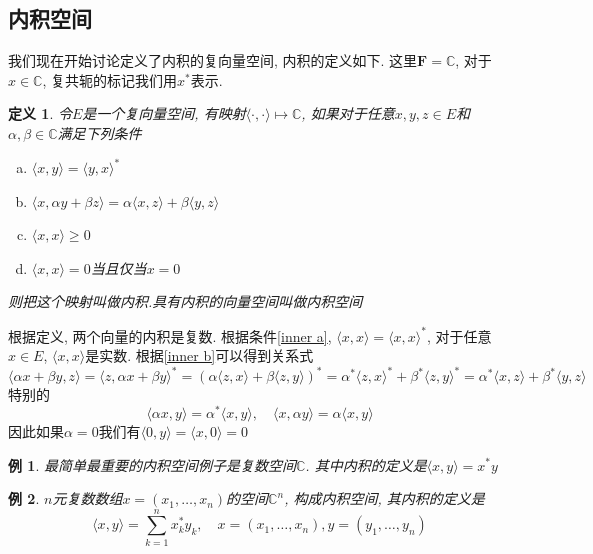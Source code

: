 \documentclass[a4paper,11pt]{book}
\newtheorem{definition}{\hspace{2em}定义}[section]
\newtheorem{example}{例}[section]
\begin{document}
\subsection*{内积空间}
我们现在开始讨论定义了内积的复向量空间, 内积的定义如下. 这里$\mathbf{F}=\mathbb{C}$, 对于$x\in\mathbb{C}$, 复共轭的标记我们用$x^*$表示.
\begin{definition}\label{inner def}
  令$E$是一个复向量空间, 有映射$\langle\cdot,\cdot\rangle\mapsto\mathbb{C}$, 如果对于任意$x,y,z\in E$和$\alpha,\beta\in \mathbb{C}$满足下列条件
  \begin{enumerate}[(a)]
    \item\label{inner a} $\langle x,y\rangle=\langle y,x\rangle^*$
    \item\label{inner b} $\langle x,\alpha y+\beta z\rangle=\alpha\langle x,z\rangle+\beta\langle y,z\rangle$
    \item $\langle x,x\rangle\geq 0$
    \item $\langle x,x\rangle=0$当且仅当$x=0$
  \end{enumerate}
  则把这个映射叫做内积.具有内积的向量空间叫做内积空间
\end{definition}
根据定义, 两个向量的内积是复数. 根据条件\ref{inner a}, $\langle x,x\rangle=\langle x,x\rangle^*$, 对于任意$x\in E$, $\langle x,x\rangle$是实数. 根据\ref{inner b}可以得到关系式
\begin{equation*}
  \langle\alpha x+\beta y,z\rangle=\langle z,\alpha x+\beta y\rangle^*=(\alpha\langle z,x\rangle+\beta\langle z,y\rangle)^*=\alpha^*\langle z,x\rangle^*+\beta^*\langle z,y\rangle^*=\alpha^*\langle x,z\rangle+\beta^*\langle y,z\rangle
\end{equation*}
特别的
\begin{equation*}
  \langle\alpha x,y\rangle=\alpha^*\langle x,y\rangle,\quad \langle x,\alpha y\rangle=\alpha\langle x,y\rangle
\end{equation*}
因此如果$\alpha=0$我们有$\langle 0,y\rangle=\langle x,0\rangle=0$
\begin{example}
  最简单最重要的内积空间例子是复数空间$\mathbb{C}$. 其中内积的定义是$\langle x,y\rangle=x^*y$
\end{example}
\begin{example}
  $n$元复数数组$x=(x_1,\dots,x_n)$的空间$\mathbb{C}^n$, 构成内积空间, 其内积的定义是
  \begin{equation*}
    \langle x,y\rangle=\sum_{k=1}^{n}x_k^* y_k,\quad x=(x_1,\dots,x_n),y=(y_1,\dots,y_n)
  \end{equation*}
\end{example}
\end{document}
